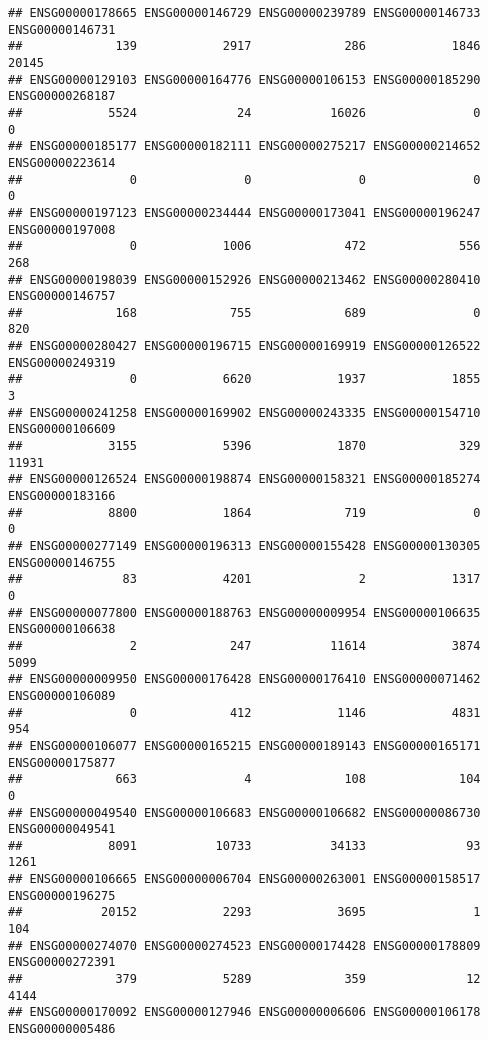 \documentclass[
]{article}
\begin{document}
\begin{verbatim}
## ENSG00000178665 ENSG00000146729 ENSG00000239789 ENSG00000146733 ENSG00000146731 
##             139            2917             286            1846           20145 
## ENSG00000129103 ENSG00000164776 ENSG00000106153 ENSG00000185290 ENSG00000268187 
##            5524              24           16026               0               0 
## ENSG00000185177 ENSG00000182111 ENSG00000275217 ENSG00000214652 ENSG00000223614 
##               0               0               0               0               0 
## ENSG00000197123 ENSG00000234444 ENSG00000173041 ENSG00000196247 ENSG00000197008 
##               0            1006             472             556             268 
## ENSG00000198039 ENSG00000152926 ENSG00000213462 ENSG00000280410 ENSG00000146757 
##             168             755             689               0             820 
## ENSG00000280427 ENSG00000196715 ENSG00000169919 ENSG00000126522 ENSG00000249319 
##               0            6620            1937            1855               3 
## ENSG00000241258 ENSG00000169902 ENSG00000243335 ENSG00000154710 ENSG00000106609 
##            3155            5396            1870             329           11931 
## ENSG00000126524 ENSG00000198874 ENSG00000158321 ENSG00000185274 ENSG00000183166 
##            8800            1864             719               0               0 
## ENSG00000277149 ENSG00000196313 ENSG00000155428 ENSG00000130305 ENSG00000146755 
##              83            4201               2            1317               0 
## ENSG00000077800 ENSG00000188763 ENSG00000009954 ENSG00000106635 ENSG00000106638 
##               2             247           11614            3874            5099 
## ENSG00000009950 ENSG00000176428 ENSG00000176410 ENSG00000071462 ENSG00000106089 
##               0             412            1146            4831             954 
## ENSG00000106077 ENSG00000165215 ENSG00000189143 ENSG00000165171 ENSG00000175877 
##             663               4             108             104               0 
## ENSG00000049540 ENSG00000106683 ENSG00000106682 ENSG00000086730 ENSG00000049541 
##            8091           10733           34133              93            1261 
## ENSG00000106665 ENSG00000006704 ENSG00000263001 ENSG00000158517 ENSG00000196275 
##           20152            2293            3695               1             104 
## ENSG00000274070 ENSG00000274523 ENSG00000174428 ENSG00000178809 ENSG00000272391 
##             379            5289             359              12            4144 
## ENSG00000170092 ENSG00000127946 ENSG00000006606 ENSG00000106178 ENSG00000005486 

\end{verbatim}
\end{document}
